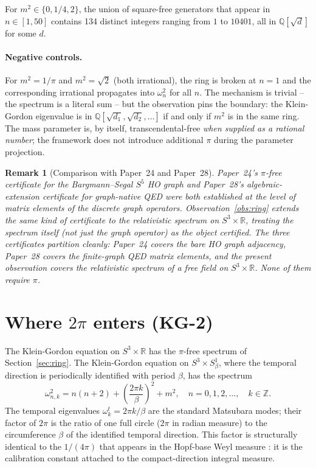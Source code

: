 \documentclass[11pt]{article}
\newtheorem{remark}{Remark}
\begin{document}
For $m^2 \in \{0, 1/4, 2\}$, the union of square-free generators that
appear in $n \in [1, 50]$ contains 134 distinct integers ranging from
$1$ to $10401$, all in $\mathbb{Q}[\sqrt{d}]$ for some $d$.

\paragraph{Negative controls.}  For $m^2 = 1/\pi$ and $m^2 = \sqrt{2}$
(both irrational), the ring is broken at $n = 1$ and the corresponding
irrational propagates into $\omega_n^2$ for all $n$.  The mechanism is
trivial -- the spectrum is a literal sum -- but the observation pins the
boundary: the Klein-Gordon eigenvalue is in
$\mathbb{Q}[\sqrt{d_1}, \sqrt{d_2}, \ldots]$ if and only if $m^2$ is in
the same ring.  The mass parameter is, by itself, transcendental-free
\emph{when supplied as a rational number}; the framework does not
introduce additional $\pi$ during the parameter projection.

\begin{remark}[Comparison with Paper~24 and Paper~28]
\label{rem:ring_compare}
Paper~24's $\pi$-free certificate for the Bargmann--Segal $S^5$ HO
graph and Paper~28's algebraic-extension certificate for graph-native
QED were both established at the level of matrix elements of the
discrete graph operators.  Observation~\ref{obs:ring} extends the same
kind of certificate to the relativistic spectrum on $S^3 \times
\mathbb{R}$, treating the spectrum itself (not just the graph operator)
as the object certified.  The three certificates partition cleanly:
Paper~24 covers the bare HO graph adjacency, Paper~28 covers the
finite-graph QED matrix elements, and the present observation covers
the relativistic spectrum of a free field on $S^3 \times \mathbb{R}$.
None of them require $\pi$.
\end{remark}

\section{Where $2\pi$ enters (KG-2)}
\label{sec:where_pi}

The Klein-Gordon equation on $S^3 \times \mathbb{R}$ has the
$\pi$-free spectrum of Section~\ref{sec:ring}.  The Klein-Gordon
equation on $S^3 \times S^1_\beta$, where the temporal direction is
periodically identified with period $\beta$, has the spectrum
\begin{equation}
\label{eq:kg_compactified}
\omega_{n,k}^2 = n(n+2) + \left(\frac{2\pi k}{\beta}\right)^2 + m^2,
\quad n = 0, 1, 2, \ldots, \quad k \in \mathbb{Z}.
\end{equation}
The temporal eigenvalues $\omega^t_k = 2\pi k / \beta$ are the standard
Matsubara modes; their factor of $2\pi$ is the ratio of one full circle
($2\pi$ in radian measure) to the circumference $\beta$ of the
identified temporal direction.  This factor is structurally identical
to the $1/(4\pi)$ that appears in the Hopf-base Weyl measure
\cite{paper33}: it is the calibration constant attached to the
compact-direction integral measure.
\end{document}
